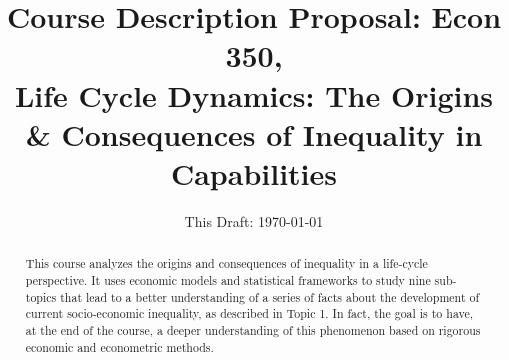 \documentclass[12pt]{article}
\begin{document}
\title{\textbf{Course Description Proposal: Econ 350,\\ Life Cycle Dynamics: The Origins \& Consequences of Inequality in Capabilities}}
\date{This Draft: \today}
\maketitle

\begin{abstract}
\noindent This course analyzes the origins and consequences of inequality in a life-cycle perspective. It uses economic models and statistical frameworks to study nine sub-topics that lead to a better understanding of a series of facts about the development of current socio-economic inequality, as described in Topic 1. In fact, the goal is to have, at the end of the course, a deeper understanding of this phenomenon based on rigorous economic and econometric methods.
\end{abstract}
\end{document}

